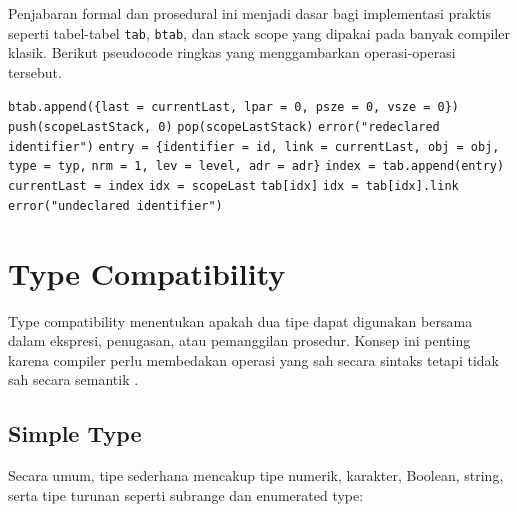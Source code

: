 Penjabaran formal dan prosedural ini menjadi dasar bagi implementasi praktis seperti tabel-tabel \texttt{tab}, \texttt{btab}, dan stack scope yang dipakai pada banyak compiler klasik. Berikut pseudocode ringkas yang menggambarkan operasi-operasi tersebut.

\begin{breakablealgorithm}
    \label{alg:scope-lookup}
    \begin{algorithmic}[1]
        \State \texttt{btab.append(\{last = currentLast, lpar = 0, psze = 0, vsze = 0\})}
        \State \texttt{push(scopeLastStack, 0)}
        \EndProcedure
        \State \texttt{pop(scopeLastStack)}
        \EndProcedure
        \State \Return \texttt{error("redeclared identifier")}
        \EndIf
        \State \texttt{entry = \{identifier = id, link = currentLast, obj = obj, type = typ,}
        \Statex \hspace{2.6em}\texttt{nrm = 1, lev = level, adr = adr\}}
        \State \texttt{index = tab.append(entry)}
        \State \texttt{currentLast = index}
        \EndProcedure
        \State \texttt{idx = scopeLast}
        \State \Return \texttt{tab[idx]}
        \EndIf
        \State \texttt{idx = tab[idx].link}
        \EndWhile
        \EndFor
        \State \Return \texttt{error("undeclared identifier")}
        \EndProcedure
    \end{algorithmic}
\end{breakablealgorithm}

\section{Type Compatibility}
Type compatibility menentukan apakah dua tipe dapat digunakan bersama dalam ekspresi, penugasan, atau pemanggilan prosedur. Konsep ini penting karena compiler perlu membedakan operasi yang sah secara sintaks tetapi tidak sah secara semantik \cite{cooper2011engineering,wirth1996compiler}.

\subsection{Simple Type}
Secara umum, tipe sederhana mencakup tipe numerik, karakter, Boolean, string, serta tipe turunan seperti subrange dan enumerated type:

